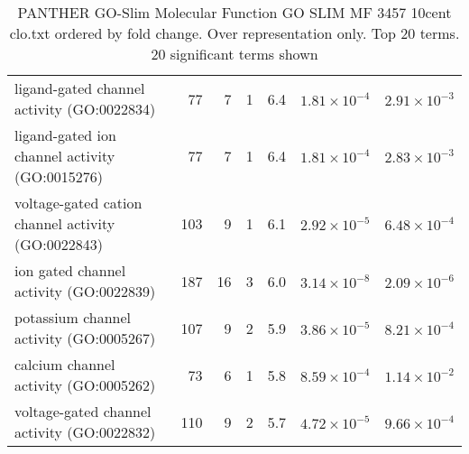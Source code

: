 \begin{table}[ht]
\begin{adjustbox}{width=\textwidth}
\begin{tabular}{lrrrrrr}
  ligand-gated channel activity (GO:0022834) & 77 & 7 & 1 & 6.4 & $1.81 \times 10^{-4}$ & $2.91 \times 10^{-3}$ \\ 
  ligand-gated ion channel activity (GO:0015276) & 77 & 7 & 1 & 6.4 & $1.81 \times 10^{-4}$ & $2.83 \times 10^{-3}$ \\ 
  voltage-gated cation channel activity (GO:0022843) & 103 & 9 & 1 & 6.1 & $2.92 \times 10^{-5}$ & $6.48 \times 10^{-4}$ \\ 
  ion gated channel activity (GO:0022839) & 187 & 16 & 3 & 6.0 & $3.14 \times 10^{-8}$ & $2.09 \times 10^{-6}$ \\ 
  potassium channel activity (GO:0005267) & 107 & 9 & 2 & 5.9 & $3.86 \times 10^{-5}$ & $8.21 \times 10^{-4}$ \\ 
  calcium channel activity (GO:0005262) & 73 & 6 & 1 & 5.8 & $8.59 \times 10^{-4}$ & $1.14 \times 10^{-2}$ \\ 
  voltage-gated channel activity (GO:0022832) & 110 & 9 & 2 & 5.7 & $4.72 \times 10^{-5}$ & $9.66 \times 10^{-4}$ \\ 
   \hline
\end{tabular}
\end{adjustbox}
\caption{PANTHER GO-Slim Molecular Function GO SLIM MF 3457 10cent clo.txt ordered by fold change. Over representation only. Top 20 terms. 20 significant terms shown} 
\label{tab:PANTHER GO-Slim Molecular Function GO SLIM MF 3457 10cent clo.txt ordered by fold change. Over representation only. Top 20 terms. 20 significant terms shown}
\end{table}


